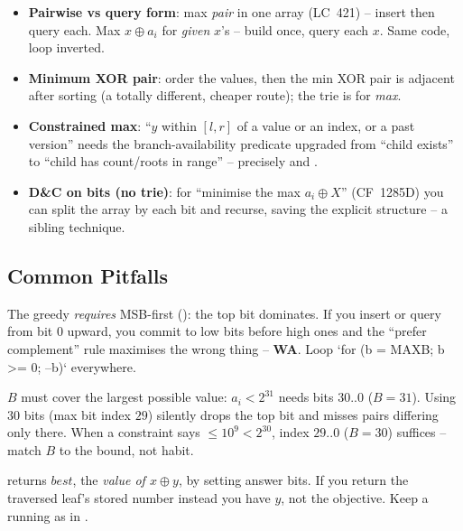 \begin{itemize}[nosep]
  \item \textbf{Pairwise vs query form}: max \emph{pair} in one array (LC~421) -- insert then query each.
        Max $x\oplus a_i$ for \emph{given} $x$'s -- build once, query each $x$. Same code, loop inverted. \hfill{}
  \item \textbf{Minimum XOR pair}: order the values, then the min XOR pair is adjacent after sorting
        (a totally different, cheaper route); the trie is for \emph{max}. \hfill{}
  \item \textbf{Constrained max}: ``$y$ within $[l,r]$ of a value or an index, or a past version'' needs
        the branch-availability predicate upgraded from ``child exists'' to ``child has count/roots in
        range'' -- precisely  and . \hfill{}
  \item \textbf{D\&C on bits (no trie)}: for ``minimise the max $a_i\oplus X$'' (CF~1285D) you can split
        the array by each bit and recurse, saving the explicit structure -- a sibling technique. \hfill{}
\end{itemize}

\subsection{Common Pitfalls}

\begin{warningbox}
The greedy \emph{requires} MSB-first (): the top bit dominates. If you insert or
query from bit $0$ upward, you commit to low bits before high ones and the ``prefer complement'' rule
 maximises the wrong thing -- \textbf{WA}. Loop `for (b = MAXB; b >= 0; --b)` everywhere.
\end{warningbox}
\begin{warningbox}
$B$ must cover the largest possible value: $a_i < 2^{31}$ needs bits $30..0$ ($B=31$). Using $30$ bits
(max bit index $29$) silently drops the top bit and misses pairs differing only there. When a constraint
says $\le 10^9 < 2^{30}$, index $29..0$ ($B=30$) suffices -- match $B$ to the bound, not habit.
\end{warningbox}
\begin{warningbox}
 returns $\mathit{best}$, the \emph{value of $x\oplus y$}, by setting answer bits. If you
return the traversed leaf's stored number instead you have $y$, not the objective. Keep a running
 as in .
\end{warningbox}

